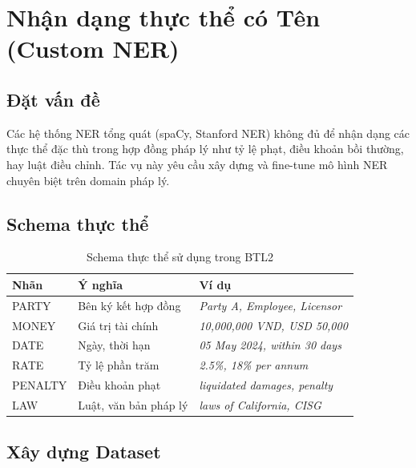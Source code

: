
\section{Nhận dạng thực thể có Tên (Custom NER)}

\subsection{Đặt vấn đề}

Các hệ thống NER tổng quát (spaCy, Stanford NER) không đủ để nhận dạng các thực thể đặc thù trong hợp đồng pháp lý như tỷ lệ phạt, điều khoản bồi thường, hay luật điều chỉnh. Tác vụ này yêu cầu xây dựng và fine-tune mô hình NER chuyên biệt trên domain pháp lý.

\subsection{Schema thực thể}

\begin{table}[H]
    \centering
    \caption{Schema thực thể sử dụng trong BTL2}
    \label{tab:ner_schema}
    \begin{tabularx}{\textwidth}{|l|X|l|}
        \hline
        \textbf{Nhãn} & \textbf{Ý nghĩa} & \textbf{Ví dụ} \\ \hline
        PARTY   & Bên ký kết hợp đồng & \textit{Party A, Employee, Licensor} \\ \hline
        MONEY   & Giá trị tài chính   & \textit{10,000,000 VND, USD 50,000} \\ \hline
        DATE    & Ngày, thời hạn      & \textit{05 May 2024, within 30 days} \\ \hline
        RATE    & Tỷ lệ phần trăm     & \textit{2.5\%, 18\% per annum} \\ \hline
        PENALTY & Điều khoản phạt     & \textit{liquidated damages, penalty} \\ \hline
        LAW     & Luật, văn bản pháp lý & \textit{laws of California, CISG} \\ \hline
    \end{tabularx}
\end{table}

\subsection{Xây dựng Dataset}

